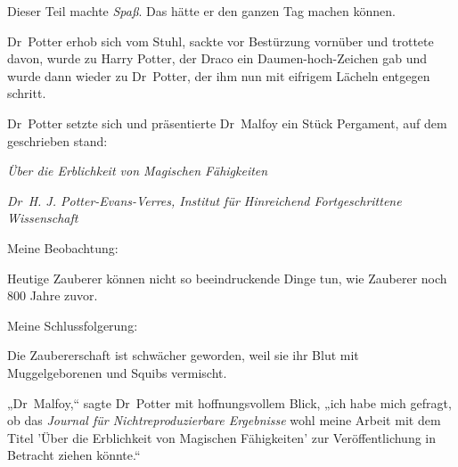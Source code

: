 Dieser Teil machte \emph{Spaß}. Das hätte er den ganzen Tag machen können.

Dr~Potter erhob sich vom Stuhl, sackte vor Bestürzung vornüber und trottete davon, wurde zu Harry Potter, der Draco ein Daumen-hoch-Zeichen gab und wurde dann wieder zu Dr~Potter, der ihm nun mit eifrigem Lächeln entgegen schritt.

Dr~Potter setzte sich und präsentierte Dr~Malfoy ein Stück Pergament, auf dem geschrieben stand:

\begin{center}
\emph{Über die Erblichkeit von Magischen Fähigkeiten}

\emph{Dr~H. J. Potter-Evans-Verres, Institut für Hinreichend Fortgeschrittene Wissenschaft}
\end{center}

\begin{writtenNote}
Meine Beobachtung:

Heutige Zauberer können nicht so beeindruckende Dinge tun, wie Zauberer noch 800 Jahre zuvor.

Meine Schlussfolgerung:

Die Zaubererschaft ist schwächer geworden, weil sie ihr Blut mit Muggelgeborenen und Squibs vermischt.
\end{writtenNote}

„Dr~Malfoy,“ sagte Dr~Potter mit hoffnungsvollem Blick, „ich habe mich gefragt, ob das \emph{Journal für Nichtreproduzierbare Ergebnisse} wohl meine Arbeit mit dem Titel 'Über die Erblichkeit von Magischen Fähigkeiten' zur Veröffentlichung in Betracht ziehen könnte.“

